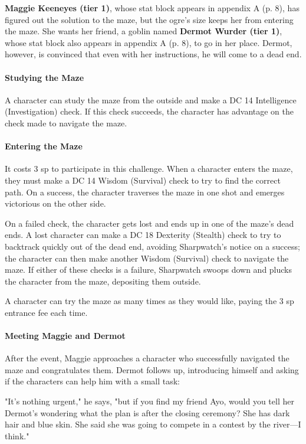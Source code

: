 \documentclass[letterpaper, 11pt, bg=full, twocolumn]{dndbook}
\begin{document}
\textbf{Maggie Keeneyes (tier 1)}, whose stat block appears in appendix A (p. 8), has figured out the solution to the maze, but the ogre's size keeps her from entering the maze. She wants her friend, a goblin named \textbf{Dermot Wurder (tier 1)}, whose stat block also appears in appendix A (p. 8), to go in her place. Dermot, however, is convinced that even with her instructions, he will come to a dead end.

\paragraph{Studying the Maze}

A character can study the maze from the outside and make a DC 14 Intelligence (Investigation) check. If this check succeeds, the character has advantage on the check made to navigate the maze.

\paragraph{Entering the Maze}

It costs 3 sp to participate in this challenge. When a character enters the maze, they must make a DC 14 Wisdom (Survival) check to try to find the correct path. On a success, the character traverses the maze in one shot and emerges victorious on the other side.

On a failed check, the character gets lost and ends up in one of the maze's dead ends. A lost character can make a DC 18 Dexterity (Stealth) check to try to backtrack quickly out of the dead end, avoiding Sharpwatch's notice on a success; the character can then make another Wisdom (Survival) check to navigate the maze. If either of these checks is a failure, Sharpwatch swoops down and plucks the character from the maze, depositing them outside.

A character can try the maze as many times as they would like, paying the 3 sp entrance fee each time.

\paragraph{Meeting Maggie and Dermot}

After the event, Maggie approaches a character who successfully navigated the maze and congratulates them. Dermot follows up, introducing himself and asking if the characters can help him with a small task:

\begin{DndReadAloud}
"It's nothing urgent," he says, "but if you find my friend Ayo, would you tell her Dermot's wondering what the plan is after the closing ceremony? She has dark hair and blue skin. She said she was going to compete in a contest by the river---I think."
\end{DndReadAloud}
\end{document}
